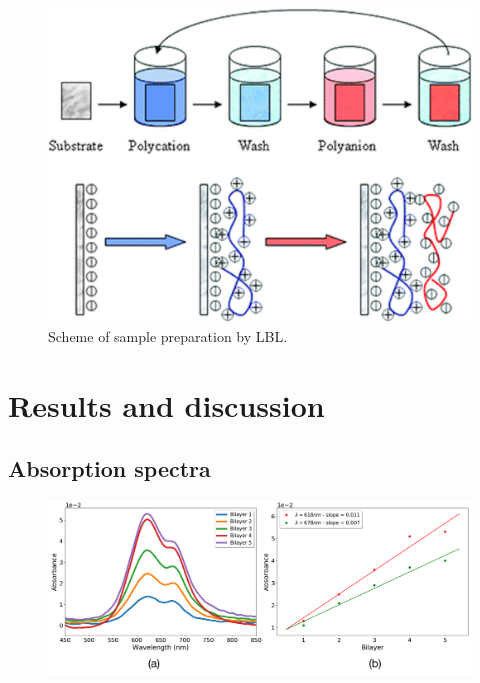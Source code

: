 \documentclass[%
 reprint,
 amsmath,amssymb,
 aps,
]{revtex4-1}
\begin{document}
 \begin{figure}[h!]
	\centering
	\includegraphics[width=0.9\columnwidth]{LBL}
	\caption{Scheme of sample preparation by LBL\cite{fig_LBL}.}
	\label{fig:lbl}
\end{figure}


\section{Results and discussion}

\subsection{Absorption spectra}


\begin{figure}[h!]
	\centering
	\includegraphics[width=\columnwidth]{uv}
	\caption{}
	\label{fig:rafael}
\end{figure}
\end{document}
